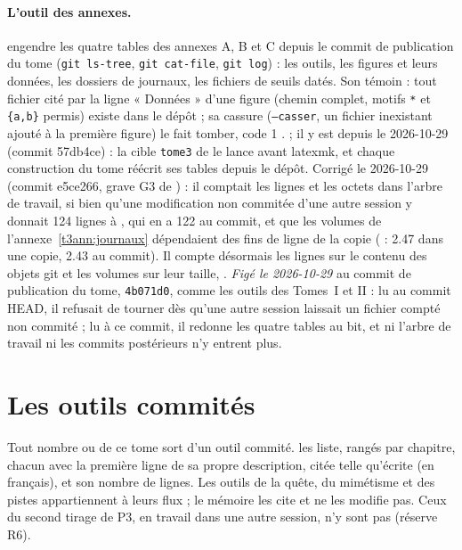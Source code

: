 \paragraph{L'outil des annexes.}  engendre les quatre tables des annexes A, B et C depuis le commit  de publication du tome (\texttt{git ls-tree}, \texttt{git cat-file}, \texttt{git log}) : les outils, les figures et leurs données, les dossiers de journaux, les fichiers de seuils datés. Son témoin : tout fichier cité par la ligne « Données » d'une figure (chemin complet, motifs \texttt{*} et \texttt{\{a,b\}} permis) existe dans le dépôt ; sa cassure (\texttt{--casser}, un fichier inexistant ajouté à la première figure) le fait tomber, code 1 \mes.  ; il y est depuis le 2026-10-29 (commit 57db4ce) : la cible \texttt{tome3} de  le lance avant latexmk, et chaque construction du tome réécrit ses tables depuis le dépôt. Corrigé le 2026-10-29 (commit e5ce266, grave G3 de ) : il comptait les lignes et les octets dans l'arbre de travail, si bien qu'une modification non commitée d'une autre session y donnait 124 lignes à , qui en a 122 au commit, et que les volumes de l'annexe~\ref{t3ann:journaux} dépendaient des fins de ligne de la copie ( : \SI{2.47}{\Mo} dans une copie, \SI{2.43}{\Mo} au commit). Il compte désormais les lignes sur le contenu des objets git et les volumes sur leur taille,  \mes. \emph{Figé le 2026-10-29} au commit de publication du tome, \texttt{4b071d0}, comme les outils des Tomes~I et II : lu au commit HEAD, il refusait de tourner dès qu'une autre session laissait un fichier compté non commité ; lu à ce commit, il redonne les quatre tables au bit, et ni l'arbre de travail ni les commits postérieurs n'y entrent plus.

\section{Les outils commités}\label{t3ann:sec:outils}

Tout nombre \mes{} ou \calc{} de ce tome sort d'un outil commité.  les liste, rangés par chapitre, chacun avec la première ligne de sa propre description, citée telle qu'écrite (en français), et son nombre de lignes. Les outils de la quête, du mimétisme et des pistes appartiennent à leurs flux ; le mémoire les cite et ne les modifie pas. Ceux du second tirage de P3, en travail dans une autre session, n'y sont pas (réserve R6).

